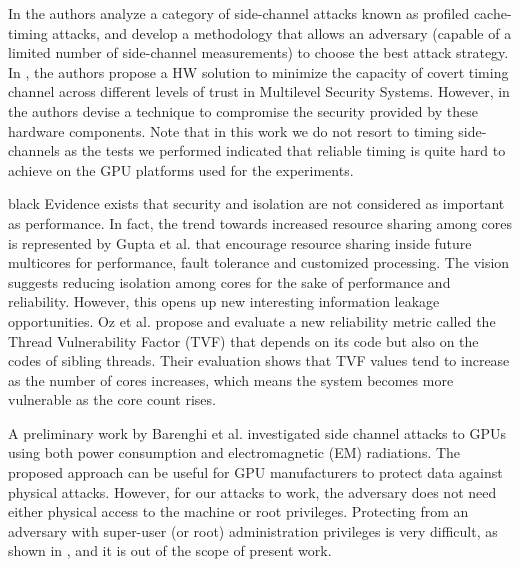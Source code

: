 \documentclass[11pt,onecolumn,letterpaper]{IEEEtran}
\newcommand{\clr}{black}
\begin{document}
In \cite{6296708} the authors analyze a category of side-channel attacks known as profiled cache-timing 
attacks, and develop a methodology that allows an adversary (capable of a limited number of side-channel measurements) 
to choose the best attack strategy. In \cite{Kang93apump}, the authors propose a HW solution to minimize the capacity of covert timing channel across
different levels of trust in Multilevel Security Systems. 
However, in \cite{TIFS-pump} the authors devise a technique to compromise the security provided by these hardware components.
Note that in this work we do not resort to timing side-channels as the tests we performed indicated that reliable 
timing is quite hard to achieve on the GPU platforms used for the experiments.\\
\begin{color}{\clr}
Evidence exists that security and isolation are not considered as important as performance. 
In fact, the trend towards increased resource sharing among cores is represented by Gupta et al. \cite{Gupta:2010:ECB:1934902.1934979} that encourage 
resource sharing inside future multicores for performance, fault tolerance and customized processing. 
The vision suggests reducing isolation among cores for the sake of performance and reliability.
However, this opens up new interesting information leakage opportunities.
Oz et al. \cite{Oz:2012:TVP:2350366.2350516} propose and evaluate a new reliability metric called the Thread Vulnerability Factor (TVF) that depends on its code but also on the codes of sibling threads.
Their evaluation shows that TVF values tend to increase as the number of cores increases, which means the system becomes more vulnerable as the core count rises. 

\end{color}
A preliminary work by Barenghi et al. \cite{springerlink:10.1007/978-3-642-21040-29} investigated side channel attacks to GPUs
using both power consumption and electromagnetic (EM) radiations.
The proposed approach can be useful for GPU manufacturers to protect data against physical attacks.
However, for our attacks to work, the adversary does not need either physical access to the machine
or root privileges.
Protecting from an adversary with super-user (or root) administration privileges is very difficult, as shown in \cite{securecloud}, and it is out of the scope of present work. 
\end{document}
